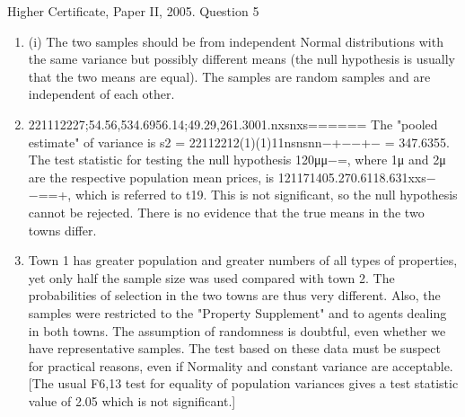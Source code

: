 \documentclass[a4paper,12pt]{article}
\begin{document}
Higher Certificate, Paper II, 2005. Question 5
\begin{enumerate}
    \item 
(i) The two samples should be from independent Normal distributions with the same variance but possibly different means (the null hypothesis is usually that the two means are equal). The samples are random samples and are independent of each other.
    \item 
221112227;54.56,534.6956.14;49.29,261.3001.nxsnxs======
The "pooled estimate" of variance is s2 = 22112212(1)(1)11nsnsnn−+−−+− = 347.6355.
The test statistic for testing the null hypothesis 120μμ−=, where 1μ and 2μ are the respective population mean prices, is
121171405.270.6118.631xxs−−==+,
which is referred to t19. This is not significant, so the null hypothesis cannot be rejected. There is no evidence that the true means in the two towns differ.
    \item  Town 1 has greater population and greater numbers of all types of properties, yet only half the sample size was used compared with town 2. The probabilities of selection in the two towns are thus very different. Also, the samples were restricted to the "Property Supplement" and to agents dealing in both towns. The assumption of randomness is doubtful, even whether we have representative samples. The test based on these data must be suspect for practical reasons, even if Normality and constant variance are acceptable. [The usual F6,13 test for equality of population variances gives a test statistic value of 2.05 which is not significant.]
\end{enumerate}
\end{document}
